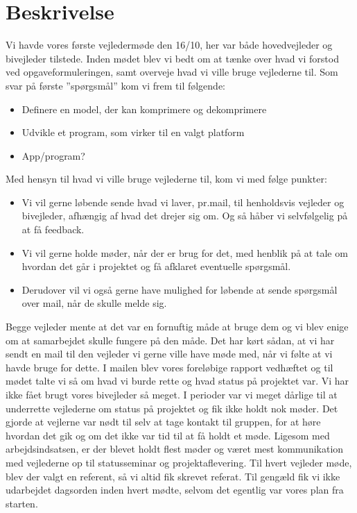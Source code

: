 \section{Beskrivelse}
Vi havde vores første vejledermøde den 16/10, her var både hovedvejleder og bivejleder tilstede. Inden mødet blev vi bedt om at tænke over hvad vi forstod ved opgaveformuleringen, samt overveje hvad vi ville bruge vejlederne til. 
Som svar på første ”spørgsmål” kom vi frem til følgende:
\begin{itemize}
\item	Definere en model, der kan komprimere og dekomprimere

\item Udvikle et program, som virker til en valgt platform


\item	App/program?
\end{itemize}
Med hensyn til hvad vi ville bruge vejlederne til, kom vi med følge punkter:
\begin{itemize}
\item	Vi vil gerne løbende sende hvad vi laver, pr.mail, til henholdsvis vejleder og bivejleder, afhængig af hvad det drejer sig om. Og så håber vi selvfølgelig på at få feedback.

\item	 Vi vil gerne holde møder, når der er brug for det, med henblik på at tale om hvordan det går i projektet og få afklaret eventuelle spørgsmål.

\item	Derudover vil vi også gerne have mulighed for løbende at sende spørgsmål over mail, når de skulle melde sig.
\end{itemize}Begge vejleder mente at det var en fornuftig måde at bruge dem og vi blev enige om at samarbejdet skulle fungere på den måde. Det har kørt sådan, at vi har sendt en mail til den vejleder vi gerne ville have møde med, når vi følte at vi havde bruge for dette. I mailen blev vores foreløbige rapport vedhæftet og til mødet talte vi så om hvad vi burde rette og hvad status på projektet var. Vi har ikke fået brugt vores bivejleder så meget. I perioder var vi meget dårlige til at underrette vejlederne om status på projektet og fik ikke holdt nok møder. Det gjorde at vejlerne var nødt til selv at tage kontakt til gruppen, for at høre hvordan det gik og om det ikke var tid til at få holdt et møde. Ligesom med arbejdsindsatsen, er der blevet holdt flest møder og været mest kommunikation med vejlederne op til statusseminar og projektaflevering. 
Til hvert vejleder møde, blev der valgt en referent, så vi altid fik skrevet referat. Til gengæld fik vi ikke udarbejdet dagsorden inden hvert mødte, selvom det egentlig var vores plan fra starten. 


